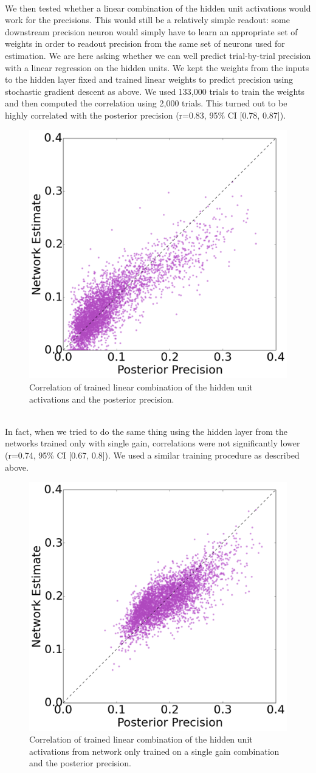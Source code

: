 \documentclass{article} %
\begin{document}
\\
We then tested whether a linear combination of the hidden unit activations would work for the precisions. This would still be a relatively simple readout: some downstream precision neuron would simply have to learn an appropriate set of weights in order to readout precision from the same set of neurons used for estimation. We are here asking whether we can well predict trial-by-trial precision with a linear regression on the hidden units. We kept the weights from the inputs to the hidden layer fixed and trained linear weights to predict precision using stochastic gradient descent as above. We used 133,000 trials to train the weights and then computed the correlation using 2,000 trials. This turned out to be highly correlated with the posterior precision (r=0.83,  95\% CI [0.78, 0.87]). 
\begin{figure}[h]
\centering
\includegraphics[width = .5\textwidth]{Linear_Combination_Precisions.png}
\caption{Correlation of trained linear combination of the hidden unit activations and the posterior precision.}
\end{figure}
\\
In fact, when we tried to do the same thing using the hidden layer from the networks trained only with single gain, correlations were not significantly lower (r=0.74, 95\% CI [0.67, 0.8]). We used a similar training procedure as described above.
\begin{figure}[h]
\centering
\includegraphics[width = .5\textwidth]{Linear_Fixed_Gains_Precisions.png}
\caption{Correlation of trained linear combination of the hidden unit activations from network only trained on a single gain combination and the posterior precision.}
\end{figure}
\end{document}
